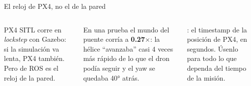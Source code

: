 \begin{frame}{El reloj de PX4, no el de la pared}
  \begin{columns}[c]
    \small
    PX4 SITL corre en \emph{lockstep} con Gazebo: si la simulación va lenta, PX4 también.
    Pero  de ROS es el reloj de la pared.
    \vspace{0.3em}

    En una prueba el mundo del puente corría a \textbf{0.27$\times$}: la hélice ``avanzaba''
    casi 4 veces más rápido de lo que el dron podía seguir y el yaw se quedaba 40° atrás.
    \vspace{0.3em}
    \begin{idea}
      \small {}: el timestamp de la posición de PX4, en segundos. Úsenlo para
      todo lo que dependa del tiempo de la misión.
    \end{idea}
  \end{columns}
\end{frame}
